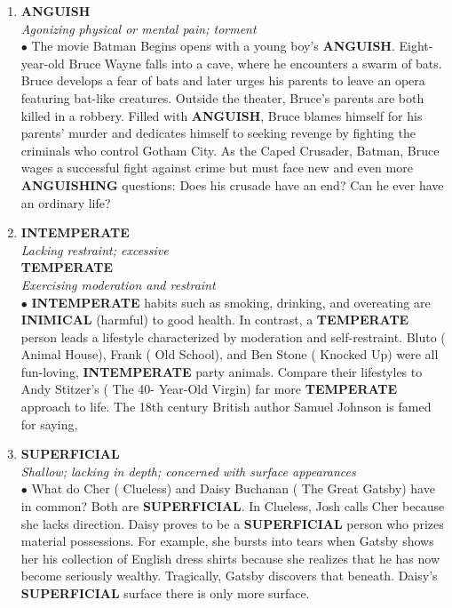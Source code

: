 \documentclass{book}
\begin{document}
\begin{enumerate}
\item \textbf{ANGUISH}\\
\textit{ Agonizing physical or mental pain; torment}\\

$\bullet$ The movie Batman Begins opens with a young boy's
\textbf{ANGUISH}. Eight-year-old Bruce Wayne falls into a
cave, where he encounters a swarm of bats. Bruce
develops a fear of bats and later urges his parents to
leave an opera featuring bat-like creatures. Outside
the theater, Bruce's parents are both killed in a
robbery. Filled with \textbf{ANGUISH}, Bruce blames himself
for his parents' murder and dedicates himself to
seeking revenge by fighting the criminals who control
Gotham City. As the Caped Crusader, Batman, Bruce
wages a successful fight against crime but must face
new and even more \textbf{ANGUISHING} questions: Does
his crusade have an end? Can he ever have an
ordinary life?

\item \textbf{INTEMPERATE}\\
\textit{ Lacking restraint; excessive }\\

\textbf{TEMPERATE}\\
\textit{ Exercising moderation and restraint}\\

$\bullet$ \textbf{INTEMPERATE} habits such as smoking, drinking, and overeating are \textbf{INIMICAL} (harmful) to good health. In contrast, a \textbf{TEMPERATE} person leads a lifestyle characterized by moderation and self-restraint. Bluto ( Animal House), Frank  ( Old School), and Ben Stone ( Knocked Up) were all fun-loving, \textbf{INTEMPERATE} party animals. Compare their lifestyles to Andy Stitzer's ( The 40- Year-Old Virgin) far more \textbf{TEMPERATE} approach to life. The 18th century British author Samuel Johnson is famed for saying,  

\item \textbf{SUPERFICIAL}\\
\textit{ Shallow; lacking in depth; concerned with surface appearances}\\

 $\bullet$ What do Cher ( Clueless) and Daisy Buchanan ( The Great Gatsby) have in common? Both are \textbf{SUPERFICIAL}. In Clueless, Josh calls Cher  because she lacks direction. Daisy proves to be a \textbf{SUPERFICIAL} person who prizes material possessions. For example, she bursts into tears when Gatsby shows her his collection of English dress shirts because she realizes that he has now become seriously wealthy. Tragically, Gatsby discovers that beneath. Daisy's \textbf{SUPERFICIAL} surface there is only more surface.
 

\end{enumerate}
\end{document}
